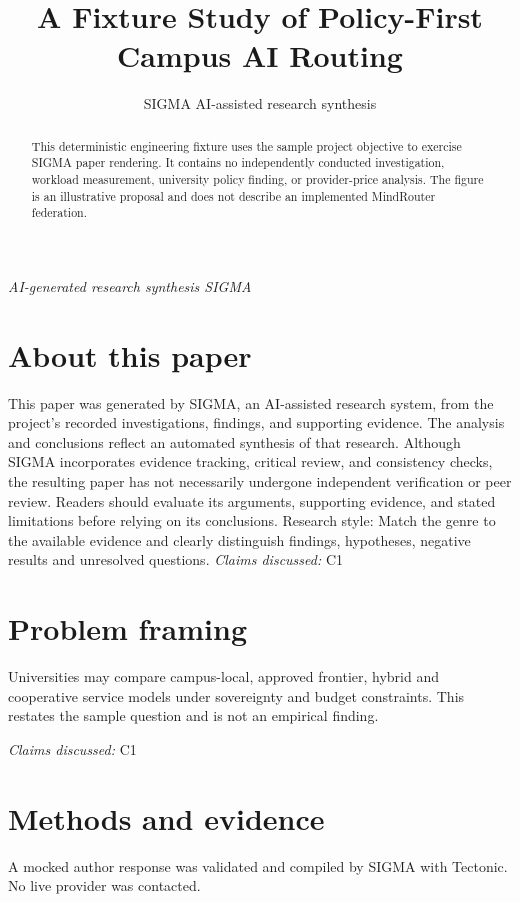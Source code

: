 \documentclass[11pt]{article}
\title{A Fixture Study of Policy-First Campus AI Routing}
\date{}
\author{SIGMA AI-assisted research synthesis}
\begin{document}
\maketitle
\begin{center}\small\textit{AI-generated research synthesis \textperiodcentered{} SIGMA}\end{center}

\begin{abstract}
This deterministic engineering fixture uses the sample project objective to exercise SIGMA paper rendering. It contains no independently conducted investigation, workload measurement, university policy finding, or provider-price analysis. The figure is an illustrative proposal and does not describe an implemented MindRouter federation.
\end{abstract}
\section*{About this paper}
This paper was generated by SIGMA, an AI-assisted research system, from the project's recorded investigations, findings, and supporting evidence.
The analysis and conclusions reflect an automated synthesis of that research. Although SIGMA incorporates evidence tracking, critical review, and consistency checks, the resulting paper has not necessarily undergone independent verification or peer review.
Readers should evaluate its arguments, supporting evidence, and stated limitations before relying on its conclusions.
Research style: Match the genre to the available evidence and clearly distinguish findings, hypotheses, negative results and unresolved questions.
\textit{Claims discussed: }C1
\section{Problem framing}
Universities may compare campus-local, approved frontier, hybrid and cooperative service models under sovereignty and budget constraints. This restates the sample question and is not an empirical finding.

\textit{Claims discussed: }C1
\section{Methods and evidence}
A mocked author response was validated and compiled by SIGMA with Tectonic. No live provider was contacted.
\end{document}
